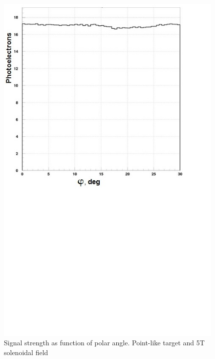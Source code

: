 \begin{figure}[!h]
    \centering
    \includegraphics[width=1.0\linewidth,trim={0.0cm 9.4cm 0.0cm 0.0cm},clip]{images/Point_Targ_5T_Field_Phi.jpg}
    \caption{Signal strength as function of polar angle. Point-like target and 5T solenoidal field}
    \label{fig:Point_Targ_5T_Field_Phi}
\end{figure}

